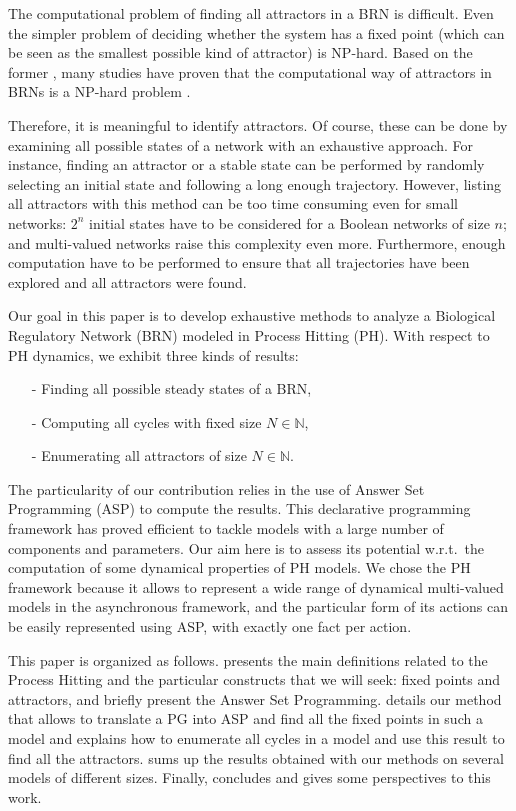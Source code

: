 
The computational problem of finding all attractors in a BRN is difficult. Even the simpler problem of deciding whether the system has a fixed point (which can be seen as the smallest possible kind of attractor) is NP-hard.
Based on the former , many studies have proven that the computational way of attractors in BRNs is a NP-hard problem \cite{klemm2005stable,akutsu2012finding}. 

Therefore, it is meaningful to identify attractors. Of course, these can be done by examining all possible states of a network with an exhaustive approach. For instance, finding an attractor or a stable state can be performed by randomly selecting an initial state and following a long enough trajectory.
However, listing all attractors with this method can be too time consuming even for small networks: $2^n$ initial states have to be considered for a Boolean networks of size $n$; and multi-valued networks raise this complexity even more. Furthermore, enough computation have to be performed to ensure that all trajectories have been explored and all attractors were found.


Our goal in this paper is to develop exhaustive methods to analyze a Biological Regulatory Network (BRN) modeled in Process Hitting (PH). With respect to PH dynamics, we exhibit three kinds of results:
\begin{itemize}
\item[-] Finding all possible steady states of a BRN,
\item[-] Computing all cycles with fixed size $N \in \mathbb{N}$,
\item[-] Enumerating all attractors of size $N \in \mathbb{N}$.
\end{itemize}
The particularity of our contribution relies in the use of Answer Set Programming
(ASP) \cite{baral2003knowledge}
to compute the results.
This declarative programming framework has proved efficient
to tackle models with a large number of components and parameters.
Our aim here is to assess its potential w.r.t.\ the computation
of some dynamical properties of PH models.
We chose the PH framework because it allows to represent a wide range of dynamical multi-valued models in the asynchronous framework, and the particular form of its actions
can be easily represented using ASP,
with exactly one fact per action.

This paper is organized as follows.
 presents the main definitions related to the Process Hitting and the particular constructs that we will seek: fixed points and attractors,
and  briefly present the Answer Set Programming.
 details our method that allows to translate a PG into ASP and find all the fixed points in such a model
and  explains how to enumerate all cycles in a model and use this result to find all the attractors.
 sums up the results obtained with our methods on several models of different sizes.
Finally,  concludes and gives some perspectives to this work.
